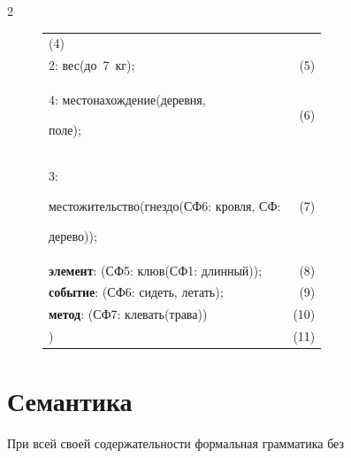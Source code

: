\begin{multicols}{2}
\begin{figure}[b]
\begin{center}
\begin{tabular}{lr}
    (4)\\

  \hspace*{5mm}{СФ}2: {вес}({до}~7~кг); &          

    (5)\\

  \hspace*{5mm}{СФ}4: {местонахождение}({деревня}, 

{поле}); &   (6)\\

  \hspace*{5mm}{СФ}3: 

{местожительство}({гнездо}({СФ}6: {кровля}, {СФ}: 

{дерево})); &(7)\\

  {\textbf{элемент}}: ({СФ}5: {клюв}({СФ}1: {длинный})); &

    (8)\\

  {\textbf{событие}}: ({СФ}6: {сидеть}, {летать}); &  (9)\\

  {\textbf{метод}}: ({СФ}7: {клевать}({трава})) & (10)\\

  )  &          (11)

  \end{tabular}

\end{center}



\end{figure}










\section{Семантика}






     При всей своей содержательности формальная грамматика без 


\end{multicols}
